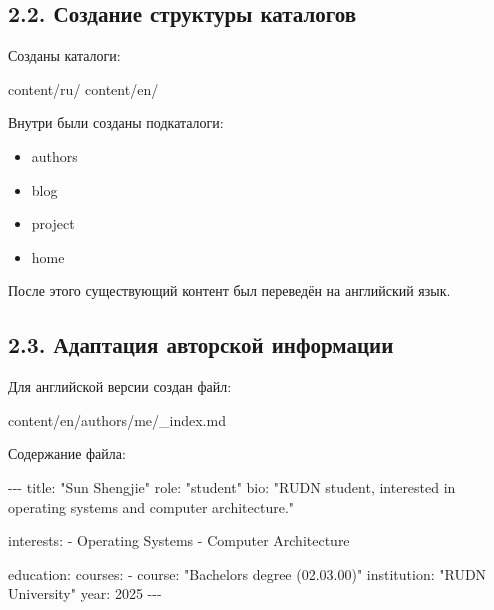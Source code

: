\documentclass[
  russian,
]{article}
\newenvironment{Shaded}{\begin{snugshade}}{\end{snugshade}}
\newcommand{\AnnotationTok}[1]{\textcolor[rgb]{0.37,0.37,0.37}{#1}}
\newcommand{\CommentTok}[1]{\textcolor[rgb]{0.37,0.37,0.37}{#1}}
\newcommand{\NormalTok}[1]{\textcolor[rgb]{0.00,0.23,0.31}{#1}}
\providecommand{\tightlist}{%
  \setlength{\itemsep}{0pt}\setlength{\parskip}{0pt}}
\begin{document}
\subsection{2.2. Создание структуры
каталогов}\label{ux441ux43eux437ux434ux430ux43dux438ux435-ux441ux442ux440ux443ux43aux442ux443ux440ux44b-ux43aux430ux442ux430ux43bux43eux433ux43eux432}

Созданы каталоги:

\begin{Shaded}
\begin{Highlighting}[]
\NormalTok{content/ru/}
\NormalTok{content/en/}
\end{Highlighting}
\end{Shaded}

Внутри были созданы подкаталоги:

\begin{itemize}
\tightlist
\item
  authors
\item
  blog
\item
  project
\item
  home
\end{itemize}

После этого существующий контент был переведён на английский язык.

\subsection{2.3. Адаптация авторской
информации}\label{ux430ux434ux430ux43fux442ux430ux446ux438ux44f-ux430ux432ux442ux43eux440ux441ux43aux43eux439-ux438ux43dux444ux43eux440ux43cux430ux446ux438ux438}

Для английской версии создан файл:

\begin{Shaded}
\begin{Highlighting}[]
\NormalTok{content/en/authors/me/\_index.md}
\end{Highlighting}
\end{Shaded}

Содержание файла:

\begin{Shaded}
\begin{Highlighting}[]
\CommentTok{{-}{-}{-}}
\AnnotationTok{title:}\CommentTok{ "Sun Shengjie"}
\AnnotationTok{role:}\CommentTok{ "student"}
\AnnotationTok{bio:}\CommentTok{ "RUDN student, interested in operating systems and computer architecture."}

\AnnotationTok{interests:}
\CommentTok{  {-} Operating Systems}
\CommentTok{  {-} Computer Architecture}

\AnnotationTok{education:}
\CommentTok{  courses:}
\CommentTok{    {-} course: "Bachelor\textquotesingle{}s degree (02.03.00)"}
\CommentTok{      institution: "RUDN University"}
\CommentTok{      year: 2025}
\CommentTok{{-}{-}{-}}
\end{Highlighting}
\end{Shaded}
\end{document}
